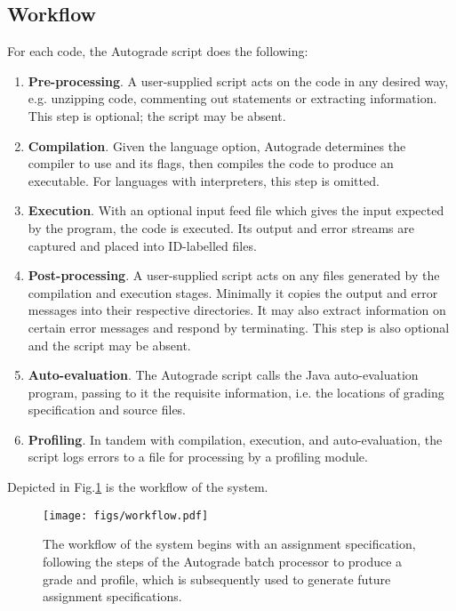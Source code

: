 \subsection{Workflow}
\label{sec:workflow}

For each code, the Autograde script does the following:

\begin{enumerate}

  \item \textbf{Pre-processing}. A user-supplied script acts on the code in any
    desired way, e.g. unzipping code, commenting out statements or extracting
    information.  This step is optional; the script may be absent.

  \item \textbf{Compilation}. Given the language option, Autograde determines
    the compiler to use and its flags, then compiles the code to produce an
    executable. For languages with interpreters, this step is omitted.

  \item \textbf{Execution}. With an optional input feed file which gives the
    input expected by the program, the code is executed.  Its output and error
    streams are captured and placed into ID-labelled files.

  \item \textbf{Post-processing}. A user-supplied script acts on any files
    generated by the compilation and execution stages. Minimally it copies the
    output and error messages into their respective directories. It may also
    extract information on certain error messages and respond by terminating.
    This step is also optional and the script may be absent.

  \item \textbf{Auto-evaluation}.  The Autograde script calls the Java
    auto-evaluation program, passing to it the requisite information, i.e.  the
    locations of grading specification and source files. 

  \item \textbf{Profiling}.  In tandem with compilation, execution, and
    auto-evaluation, the script logs errors to a file for processing
    by a profiling module.

\end{enumerate}

Depicted in Fig.\ref{fig:workflow} is the workflow of the system.

\begin{figure}
  \texttt{[image: figs/workflow.pdf]}
  \caption{The workflow of the system begins with an assignment specification,
following the steps of the Autograde batch processor to produce a grade and
profile, which is subsequently used to generate future assignment
specifications.}
  \label{fig:workflow}
\end{figure}


